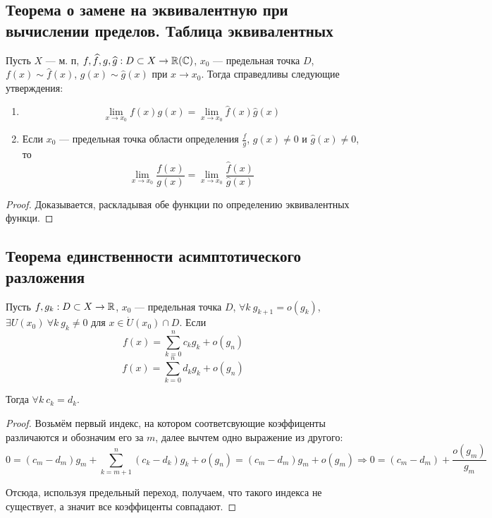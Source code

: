 \newpage
\subsection{Теорема о замене на эквивалентную при вычислении пределов. Таблица эквивалентных}
\begin{theorem*}
Пусть $X$ {---} м. п, $f, \widehat{f}, g, \widehat{g}: D \subset X \rightarrow \operatorname*{\mathbb{R}} (\mathbb{C})$, $x_0$ {---} предельная точка $D$, $f(x) \sim \widehat{f}(x)$, $g(x) \sim \widehat{g}(x)$ при $x \to x_0$. Тогда справедливы следующие утверждения:
\begin{enumerate}
    \item \[ \lim_{x\to x_0}{f(x)g(x)} = \lim_{x \to x_0}{\widehat{f}(x)\widehat{g}(x)} \]
    \item Если $x_0$ {---} предельная точка области определения $\displaystyle \frac{f}{g}$, $g(x) \neq 0$ и $\widehat{g}(x) \neq 0$, то
    \[ \lim_{x\to x_0}{\frac{f(x)}{g(x)}} = \lim_{x\to x_0}{\frac{\widehat{f}(x)}{\widehat{g}(x)}} \]
\end{enumerate}
\end{theorem*}
\begin{proof}Доказывается, раскладывая обе функции по определению эквивалентных функци.
\end{proof}

\newpage
\subsection{Теорема единственности асимптотического разложения}
\begin{theorem*}
Пусть $f, g_k: D \subset X \rightarrow \operatorname*{\mathbb{R}}$, $x_0$ {---} предельная точка $D$, $\forall k \ g_{k + 1} = o(g_k)$, $\exists U(x_0) \ \forall k \ g_k \neq 0$ для $x \in \dot U(x_0) \cap D$. Если
$$f(x) = \sum_{k = 0}^{n}c_kg_k + o(g_n)$$
$$f(x) = \sum_{k = 0}^{n}d_kg_k + o(g_n)$$
  
Тогда $\forall k \ c_k = d_k$.
\end{theorem*}
\begin{proof}
Возьмём первый индекс, на котором соответсвующие коэффиценты различаются и обозначим его за $m$, далее вычтем одно выражение из другого:
$$0 = (c_m - d_m)g_m + \sum_{k = m + 1}^{n}{(c_k - d_k)g_k} + o(g_n) = (c_m - d_m)g_m + o(g_m) \Rightarrow 0 = (c_m - d_m) + \frac{o(g_m)}{g_m}$$
  
Отсюда, используя предельный переход, получаем, что такого индекса не существует, а значит все коэффиценты совпадают.
\end{proof}

